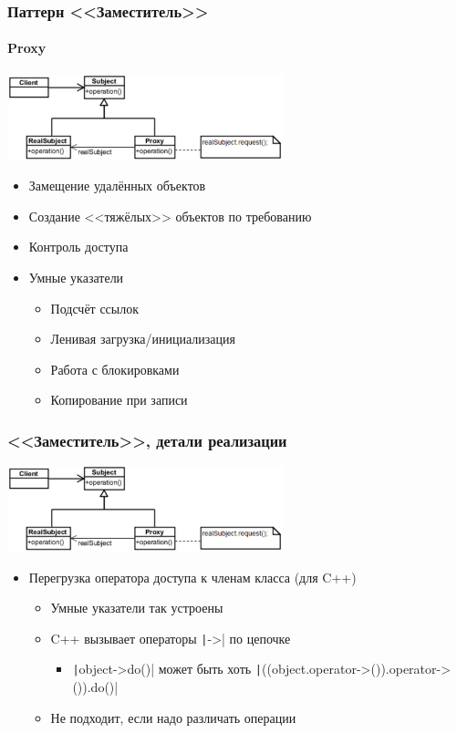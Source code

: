 \documentclass[xetex,mathserif,serif]{beamer}
\begin{document}
    \begin{frame}
        \frametitle{Паттерн <<Заместитель>>}
        \framesubtitle{Proxy}
        \begin{center}
            \includegraphics[width=0.6\textwidth]{proxy.png}
        \end{center}
        \begin{itemize}
            \item Замещение удалённых объектов
            \item Создание <<тяжёлых>> объектов по требованию
            \item Контроль доступа
            \item Умные указатели
            \begin{itemize}
                \item Подсчёт ссылок
                \item Ленивая загрузка/инициализация
                \item Работа с блокировками
                \item Копирование при записи
            \end{itemize}
        \end{itemize}
    \end{frame}

    \begin{frame}
        \frametitle{<<Заместитель>>, детали реализации}
        \begin{center}
            \includegraphics[width=0.6\textwidth]{proxy.png}
        \end{center}
        \begin{itemize}
            \item Перегрузка оператора доступа к членам класса (для C++)
            \begin{itemize}
                \item Умные указатели так устроены
                \item C++ вызывает операторы \texttt|->| по цепочке
                \begin{itemize}
                    \item \texttt|object->do()| может быть хоть \texttt|((object.operator->()).operator->()).do()|
                \end{itemize}
                \item Не подходит, если надо различать операции
            \end{itemize}
        \end{itemize}
    \end{frame}
\end{document}
